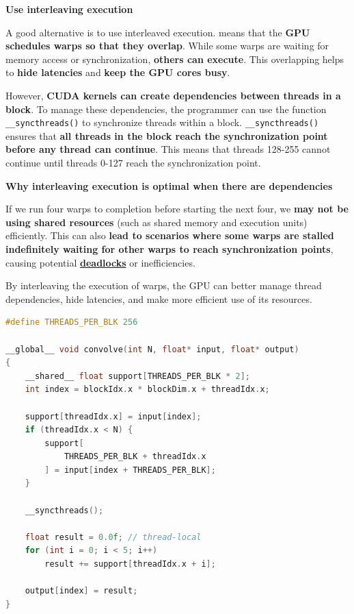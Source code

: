 \highspace
\begin{flushleft}
    \textcolor{Green3}{ \textbf{Use interleaving execution}}
\end{flushleft}
A good alternative is to use interleaved execution.  means that the \textbf{GPU schedules warps so that they overlap}. While some warps are waiting for memory access or synchronization, \textbf{others can execute}. This overlapping helps to \textbf{hide latencies} and \textbf{keep the GPU cores busy}.

\highspace
However, \textbf{CUDA kernels can create dependencies between threads in a block}. To manage these dependencies, the programmer can use the function \texttt{\_\_syncthreads()} to synchronize threads within a block. \texttt{\_\_syncthreads()} ensures that \textbf{all threads in the block reach the synchronization point before any thread can continue}. This means that threads 128-255 cannot continue until threads 0-127 reach the synchronization point.

\highspace
\begin{flushleft}
    \textcolor{Green3}{ \textbf{Why interleaving execution is optimal when there are dependencies}}
\end{flushleft}
If we run four warps to completion before starting the next four, we \textbf{may not be using shared resources} (such as shared memory and execution units) efficiently. This can also \textbf{lead to scenarios where some warps are stalled indefinitely waiting for other warps to reach synchronization points}, causing potential \textbf{\underline{deadlocks}} or inefficiencies.

By interleaving the execution of warps, the GPU can better manage thread dependencies, hide latencies, and make more efficient use of its resources.

\highspace
\begin{lstlisting}[language=C++]
#define THREADS_PER_BLK 256

__global__ void convolve(int N, float* input, float* output)
{
    __shared__ float support[THREADS_PER_BLK * 2];
    int index = blockIdx.x * blockDim.x + threadIdx.x;

    support[threadIdx.x] = input[index];
    if (threadIdx.x < N) {
        support[
            THREADS_PER_BLK + threadIdx.x
        ] = input[index + THREADS_PER_BLK];
    }

    __syncthreads();

    float result = 0.0f; // thread-local
    for (int i = 0; i < 5; i++)
        result += support[threadIdx.x + i];

    output[index] = result;
}
\end{lstlisting}

